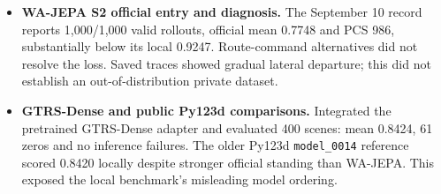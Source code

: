 \begin{itemize}
\item \textbf{WA-JEPA S2 official entry and diagnosis.} The September 10 record reports 1,000/1,000 valid rollouts, official mean 0.7748 and PCS 986, substantially below its local 0.9247. Route-command alternatives did not resolve the loss. Saved traces showed gradual lateral departure; this did not establish an out-of-distribution private dataset.
\item \textbf{GTRS-Dense and public Py123d comparisons.} Integrated the pretrained GTRS-Dense \cite{gtrs} adapter and evaluated 400 scenes: mean 0.8424, 61 zeros and no inference failures. The older Py123d \texttt{model\_0014} reference scored 0.8420 locally despite stronger official standing than WA-JEPA. This exposed the local benchmark's misleading model ordering.
\end{itemize}

